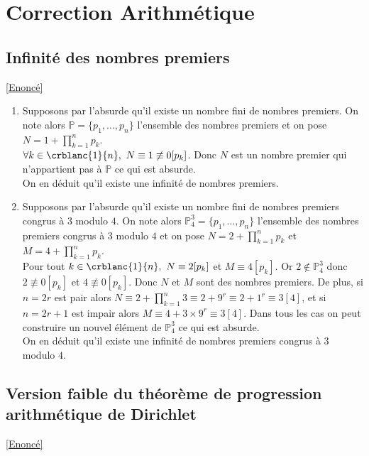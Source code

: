 \documentclass[8pt]{book}
\begin{document}
	\newpage
\section{Correction Arithmétique}
	\subsection{Infinité des nombres premiers }
	\label{Infinité des nombres premiers corrigé}
	\textcolor{blue}{\hyperref[Infinité des nombres premiers]{[Enoncé]}}\\
	\begin{enumerate}[leftmargin=*]
		\item Supposons par l'absurde qu'il existe un nombre fini de nombres premiers. On note alors $\mathbb P=\{p_1,\dots,p_n\}$ l'ensemble des nombres premiers et on pose $N=1+\displaystyle\prod_{k=1}^np_k$.\\
		$\forall k\in \crblanc{1}{n},\ N\equiv 1\not\equiv 0[p_k]$. Donc $N$ est un nombre premier qui n'appartient pas à $\mathbb P$ ce qui est absurde.\\
		On en déduit qu'il existe une infinité de nombres premiers.
		\item Supposons par l'absurde qu'il existe un nombre fini de nombres premiers congrus à $3$ modulo $4$. On note alors $\mathbb P_4^3=\{p_1,\dots,p_n\}$ l'ensemble des nombres premiers congrus à $3$ modulo $4$ et on pose $N=2+\displaystyle\prod_{k=1}^np_k$ et $M=4+\displaystyle\prod_{k=1}^np_k$.\\
		Pour tout $k\in \crblanc{1}{n},\ N\equiv 2[p_k]$ et $M\equiv 4[p_k]$. Or $2\notin \mathbb P_4^3$ donc $2\not\equiv 0[p_k]$ et $4\not\equiv 0[p_k]$. Donc $N$ et $M$ sont des nombres premiers. De plus, si $n=2r$ est pair alors $N\equiv 2+\displaystyle\prod_{k=1}^n3\equiv 2+9^r\equiv 2+1^r\equiv 3[4]$, et si $n=2r+1$ est impair alors $M\equiv 4+3\times 9^r\equiv 3[4]$. Dans tous les cas on peut construire un nouvel élément de $\mathbb P_4^3$ ce qui est absurde.\\
		On en déduit qu'il existe une infinité de nombres premiers congrus à $3$ modulo $4$.
	\end{enumerate}
	
	\subsection{Version faible du théorème de progression arithmétique de Dirichlet}
	\label{Version faible du théorème de progression arithmétique de Dirichlet corrigé}
	\textcolor{blue}{\hyperref[Version, faible du théorème de progression arithmétique de Dirichlet]{[Enoncé]}}\\
	
\end{document}

